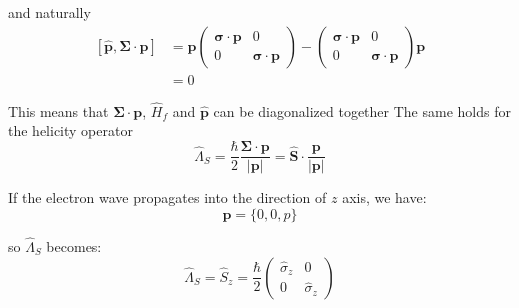 and naturally
\begin{equation}
\begin{aligned}
[\hat{\bm{p}}, \bm{\Sigma}\cdot\bm{p}] &= \bm{p} \begin{pmatrix} \bm{\sigma}\cdot\bm{p} & 0 \\ 0 & \bm{\sigma}\cdot\bm{p} \end{pmatrix} - \begin{pmatrix} \bm{\sigma}\cdot\bm{p} & 0 \\ 0 & \bm{\sigma}\cdot\bm{p} \end{pmatrix} \bm{p} \\
&= 0
\end{aligned}
\end{equation}

This means that $\bm{\Sigma}\cdot\bm{p}$, $\hat{H}_f$ and $\hat{\bm{p}}$ can be diagonalized together
The same holds for the helicity operator
\begin{equation}
\hat{\Lambda}_S = \frac{\hbar}{2} \frac{\bm{\Sigma}\cdot\bm{p}}{|\bm{p}|} = \hat{\bm{S}} \cdot \frac{\bm{p}}{|\bm{p}|}
\end{equation}

If the electron wave propagates into the direction of $z$ axis, we have:
\begin{equation}
\bm{p} = \{0, 0, p\}
\end{equation}

so $\hat{\Lambda}_S$ becomes:
\begin{equation}
\hat{\Lambda}_S = \hat{S}_z = \frac{\hbar}{2} \begin{pmatrix} \hat{\sigma}_z & 0 \\ 0 & \hat{\sigma}_z \end{pmatrix}
\end{equation}

